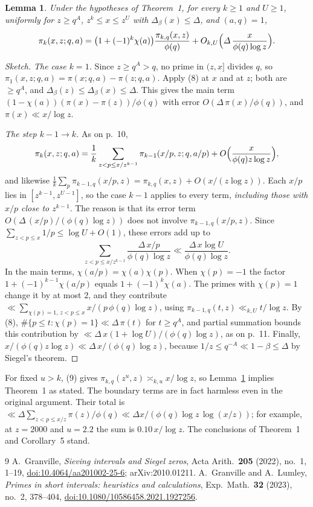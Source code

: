 \documentclass[11pt,a4paper]{amsart}
\newtheorem{lemma}[theorem]{Lemma}
\theoremstyle{remark}
\begin{document}
\begin{lemma}\label{lem:abs}
Under the hypotheses of Theorem~1, for every $k\ge1$ and $U\ge1$, uniformly for $z\ge q^A$,
$z^k\le x\le z^U$ with $\varDelta_\beta(x)\le\varDelta$, and $(a,q)=1$,
\[
\pi_k(x,z;q,a)=\bigl(1+(-1)^k\chi(a)\bigr)\frac{\pi_{k,q}(x,z)}{\phi(q)}+O_{k,U}\Bigl(\varDelta\,\frac{x}{\phi(q)\log z}\Bigr).
\]
\end{lemma}

\begin{proof}[Sketch]
\emph{The case $k=1$.} Since $z\ge q^A>q$, no prime in $(z,x]$ divides $q$, so
$\pi_1(x,z;q,a)=\pi(x;q,a)-\pi(z;q,a)$. Apply (8) at $x$ and at $z$; both are $\ge q^A$, and
$\varDelta_\beta(z)\le\varDelta_\beta(x)\le\varDelta$. This gives the main term
$(1-\chi(a))(\pi(x)-\pi(z))/\phi(q)$ with error $O(\varDelta\,\pi(x)/\phi(q))$, and $\pi(x)\ll x/\log z$.

\emph{The step $k-1\to k$.} As on p.~10,
\[
\pi_k(x,z;q,a)=\frac1k\sum_{z<p\le x/z^{k-1}}\pi_{k-1}(x/p,z;q,a/p)+O\Bigl(\frac{x}{\phi(q)z\log z}\Bigr),
\]
and likewise $\frac1k\sum_p\pi_{k-1,q}(x/p,z)=\pi_{k,q}(x,z)+O(x/(z\log z))$. Each $x/p$ lies in
$[z^{k-1},z^{U-1}]$, so the case $k-1$ applies to every term, \emph{including those with $x/p$ close to
$z^{k-1}$}. The reason is that its error term $O(\varDelta\,(x/p)/(\phi(q)\log z))$ does not involve
$\pi_{k-1,q}(x/p,z)$. Since $\sum_{z<p\le x}1/p\le\log U+O(1)$, these errors add up to
\[
\sum_{z<p\le x/z^{k-1}}\frac{\varDelta\,x/p}{\phi(q)\log z}\ll\frac{\varDelta\,x\log U}{\phi(q)\log z}.
\]
In the main terms, $\chi(a/p)=\chi(a)\chi(p)$. When $\chi(p)=-1$ the factor $1+(-1)^{k-1}\chi(a/p)$
equals $1+(-1)^k\chi(a)$. The primes with $\chi(p)=1$ change it by at most $2$, and they contribute
$\ll\sum_{\chi(p)=1,\,z<p\le x}x/(p\,\phi(q)\log z)$, using $\pi_{k-1,q}(t,z)\ll_{k,U}t/\log z$. By (8),
$\#\{p\le t:\chi(p)=1\}\ll\varDelta\,\pi(t)$ for $t\ge q^A$, and partial summation bounds this
contribution by $\ll\varDelta\,x(1+\log U)/(\phi(q)\log z)$, as on p.~11. Finally,
$x/(\phi(q)z\log z)\ll\varDelta\,x/(\phi(q)\log z)$, because $1/z\le q^{-A}\ll1-\beta\le\varDelta$ by
Siegel's theorem.
\end{proof}

For fixed $u>k$, (9) gives $\pi_{k,q}(z^u,z)\asymp_{k,u}x/\log z$, so Lemma~\ref{lem:abs} implies
Theorem~1 as stated. The boundary terms are in fact harmless even in the original argument. Their total
is $\ll\varDelta\sum_{z<p\le x/z}\pi(z)/\phi(q)\ll\varDelta x/(\phi(q)\log z\,\log(x/z))$; for example, at
$z=2000$ and $u=2.2$ the sum is $0.10\,x/\log z$. The conclusions of Theorem~1 and Corollary~5 stand.

\begin{thebibliography}{9}
 A.~Granville, \emph{Sieving intervals and Siegel zeros}, Acta Arith.\ \textbf{205} (2022),
no.~1, 1--19, \href{https://doi.org/10.4064/aa201002-25-6}{doi:10.4064/aa201002-25-6}; arXiv:2010.01211.
 A.~Granville and A.~Lumley, \emph{Primes in short intervals: heuristics and calculations},
Exp.\ Math.\ \textbf{32} (2023), no.~2, 378--404, \href{https://doi.org/10.1080/10586458.2021.1927256}{doi:10.1080/10586458.2021.1927256}.
\end{thebibliography}
\end{document}
